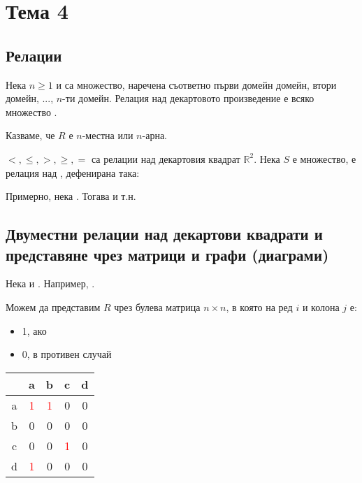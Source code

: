 \section{Тема 4} %

\subsection{Релации}
Нека \(n \ge 1\) и  са множество, наречена съответно първи домейн домейн, 
втори домейн, ..., \(n\)-ти домейн. Релация над декартовото произведение 
е всяко множество .

Казваме, че \(R\) е \(n\)-местна или \(n\)-арна.

 \(<, \le, >, \ge, =\) са релации над декартовия квадрат \(\mathbb{R}^2\).
Нека \(S\) е множество,  е релация над , дефенирана така:

Примерно, нека . Тогава  и т.н.

\subsection{Двуместни релации над декартови квадрати и представяне чрез матрици и графи (диаграми)}
Нека  и .
Например, . \\


Можем да представим \(R\) чрез булева матрица \(n \times n\), в която на ред \(i\) и колона \(j\) е:
\begin{itemize}
    \item 1, ако 
    \item 0, в противен случай
\end{itemize}

\begin{center}
    \begin{tabular}{ | c | c | c | c | c | } 
        \hline
        & a & b & c & d \\
        \hline
        a & \textcolor{red}{1} & \textcolor{red}{1} & 0 & 0 \\
        \hline
        b & 0 & 0 & 0 & 0 \\
        \hline
        c & 0 & 0 & \textcolor{red}{1} & 0 \\
        \hline
        d & \textcolor{red}{1} & 0 & 0 & 0 \\
        \hline
    \end{tabular}
\end{center}

